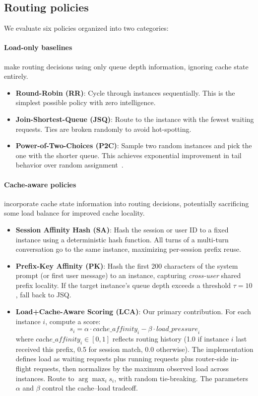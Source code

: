 \documentclass{article}
\begin{document}
\subsection{Routing policies}

We evaluate six policies organized into two categories:

\paragraph{Load-only baselines} make routing decisions using only queue depth information, ignoring cache state entirely.

\begin{itemize}
    \item \textbf{Round-Robin (RR)}: Cycle through instances sequentially. This is the simplest possible policy with zero intelligence.
    \item \textbf{Join-Shortest-Queue (JSQ)}: Route to the instance with the fewest waiting requests. Ties are broken randomly to avoid hot-spotting.
    \item \textbf{Power-of-Two-Choices (P2C)}: Sample two random instances and pick the one with the shorter queue. This achieves exponential improvement in tail behavior over random assignment~\citep{mitzenmacher2001power}.
\end{itemize}

\paragraph{Cache-aware policies} incorporate cache state information into routing decisions, potentially sacrificing some load balance for improved cache locality.

\begin{itemize}
    \item \textbf{Session Affinity Hash (SA)}: Hash the session or user ID to a fixed instance using a deterministic hash function. All turns of a multi-turn conversation go to the same instance, maximizing per-session prefix reuse.
    \item \textbf{Prefix-Key Affinity (PK)}: Hash the first 200 characters of the system prompt (or first user message) to an instance, capturing \emph{cross-user} shared prefix locality. If the target instance's queue depth exceeds a threshold $\tau = 10$, fall back to JSQ.
    \item \textbf{Load+Cache-Aware Scoring (LCA)}: Our primary contribution. For each instance $i$, compute a score:
    \begin{equation}
    \label{eq:scoring}
    s_i = \alpha \cdot \textit{cache\_affinity}_i - \beta \cdot \textit{load\_pressure}_i
    \end{equation}
    where $\textit{cache\_affinity}_i \in [0, 1]$ reflects routing history (1.0 if instance $i$ last received this prefix, 0.5 for session match, 0.0 otherwise). The implementation defines load as waiting requests plus running requests plus router-side in-flight requests, then normalizes by the maximum observed load across instances. Route to $\arg\max_i s_i$, with random tie-breaking. The parameters $\alpha$ and $\beta$ control the cache--load tradeoff.
\end{itemize}
\end{document}
